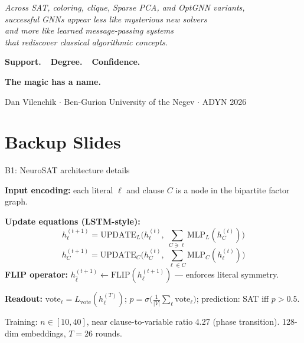 \documentclass[aspectratio=169,10pt,dvipsnames]{beamer}
\begin{document}
\begin{frame}[plain]
\vspace{0.5cm}
\begin{center}

\textcolor{bgucolor}{\large\textit{Across SAT, coloring, clique, Sparse PCA, and OptGNN variants,}}\\[0.4cm]
\textcolor{bgucolor}{\large\textit{successful GNNs appear less like mysterious new solvers}}\\[0.4cm]
\textcolor{bgucolor}{\large\textit{and more like learned message-passing systems}}\\[0.4cm]
\textcolor{bgucolor}{\large\textit{that rediscover classical algorithmic concepts.}}

\bigskip\bigskip
\LARGE\textbf{Support.\ \ Degree.\ \ Confidence.}

\bigskip\bigskip
{\Large\color{emphcolor}\textbf{The magic has a name.}}

\bigskip\bigskip
\small\color{gray}
Dan Vilenchik $\cdot$ Ben-Gurion University of the Negev $\cdot$ ADYN 2026

\end{center}
\end{frame}


\appendix

\section*{Backup Slides}

\begin{frame}{B1: NeuroSAT architecture details}

\textbf{Input encoding:} each literal $\ell$ and clause $C$ is a node in the bipartite factor graph.

\medskip
\textbf{Update equations (LSTM-style):}
\[
  h_\ell^{(t+1)} = \mathrm{UPDATE}_L\!\bigl(h_\ell^{(t)},\;
    \textstyle\sum_{C \ni \ell} \mathrm{MLP}_{L}(h_C^{(t)})\bigr)
\]
\[
  h_C^{(t+1)} = \mathrm{UPDATE}_C\!\bigl(h_C^{(t)},\;
    \textstyle\sum_{\ell \in C} \mathrm{MLP}_{C}(h_\ell^{(t)})\bigr)
\]
\textbf{FLIP operator:} $h_{\bar\ell}^{(t+1)} \leftarrow \mathrm{FLIP}(h_\ell^{(t+1)})$ — enforces literal symmetry.

\medskip
\textbf{Readout:} $\mathrm{vote}_\ell = L_\mathrm{vote}(h_\ell^{(T)})$;
  $p = \sigma\!\bigl(\tfrac{1}{|V|}\sum_\ell \mathrm{vote}_\ell\bigr)$;
  prediction: SAT iff $p > 0.5$.

\medskip\small
Training: $n\in[10,40]$, near clause-to-variable ratio 4.27 (phase transition). 128-dim embeddings, $T=26$ rounds.
\end{frame}
\end{document}
